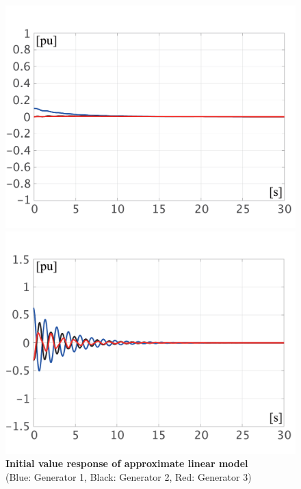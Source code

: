 \documentclass[tombow,dvipdfmx]{corona-a5-1.1}
\begin{document}
\begin{figure}[t]
{\begin{minipage}{0.49\linewidth}
    \includegraphics[width = 1.0\linewidth]{figs/Elin}
    \medskip
  \end{minipage}
  \begin{minipage}{0.49\linewidth}
    \centering
    \includegraphics[width = 1.0\linewidth]{figs/Plin}
    \medskip
  \end{minipage}
  }
  \medskip
  \caption{\textbf{Initial value response of approximate linear model}
  \\  \centering(Blue: Generator 1, Black: Generator 2, Red: Generator 3)}
  \label{fig:timeex}
\medskip
\end{figure}
\end{document}
